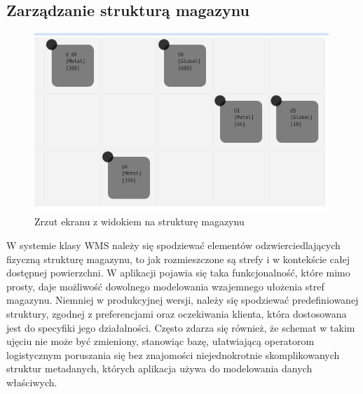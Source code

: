 	\subsection{Zarządzanie strukturą magazynu}
		\begin{figure}[H]
			\centering
			\includegraphics[width=0.99\textwidth]{images/app/unit_preview}
			\caption[Aplikacja - Zarządzania strukturą magazynu]{Zrzut ekranu z widokiem na strukturę magazynu}
			\label{c7:fig:app:unit_preview}
		\end{figure}
		W systemie klasy WMS należy się spodziewać elementów odzwierciedlających fizyczną strukturę magazynu,
		to jak rozmieszczone są strefy i w kontekście całej dostępnej powierzchni. W aplikacji pojawia się taka
		funkcjonalność, które mimo prosty, daje możliwość dowolnego modelowania wzajemnego ułożenia stref
		magazynu. Niemniej w produkcyjnej wersji, należy się spodziewać predefiniowanej struktury, zgodnej z
		preferencjami oraz oczekiwania klienta, która dostosowana jest do specyfiki jego działalności. Często
		zdarza się również, że schemat w takim ujęciu nie może być zmieniony, stanowiąc bazę, ułatwiającą
		operatorom logistycznym poruszania się bez znajomości niejednokrotnie skomplikowanych struktur metadanych, których
		aplikacja używa do modelowania danych właściwych. 
